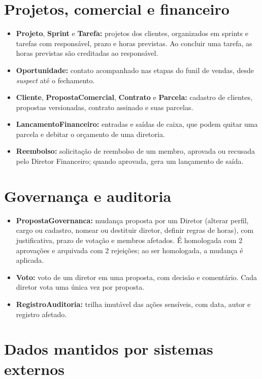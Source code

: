 \section{Projetos, comercial e financeiro}


\begin{itemize}
    \item \textbf{Projeto}, \textbf{Sprint} e \textbf{Tarefa:} projetos dos clientes, organizados em sprints e tarefas com responsável, prazo e horas previstas. Ao concluir uma tarefa, as horas previstas são creditadas ao responsável.
    \item \textbf{Oportunidade:} contato acompanhado nas etapas do funil de vendas, desde \textit{suspect} até o fechamento.
    \item \textbf{Cliente}, \textbf{PropostaComercial}, \textbf{Contrato} e \textbf{Parcela:} cadastro de clientes, propostas versionadas, contrato assinado e suas parcelas.
    \item \textbf{LancamentoFinanceiro:} entradas e saídas de caixa, que podem quitar uma parcela e debitar o orçamento de uma diretoria.
    \item \textbf{Reembolso:} solicitação de reembolso de um membro, aprovada ou recusada pelo Diretor Financeiro; quando aprovada, gera um lançamento de saída.
\end{itemize}

\section{Governança e auditoria}


\begin{itemize}
    \item \textbf{PropostaGovernanca:} mudança proposta por um Diretor (alterar perfil, cargo ou cadastro, nomear ou destituir diretor, definir regras de horas), com justificativa, prazo de votação e membros afetados. É homologada com 2 aprovações e arquivada com 2 rejeições; ao ser homologada, a mudança é aplicada.
    \item \textbf{Voto:} voto de um diretor em uma proposta, com decisão e comentário. Cada diretor vota uma única vez por proposta.
    \item \textbf{RegistroAuditoria:} trilha imutável das ações sensíveis, com data, autor e registro afetado.
\end{itemize}

\section*{Dados mantidos por sistemas externos}

